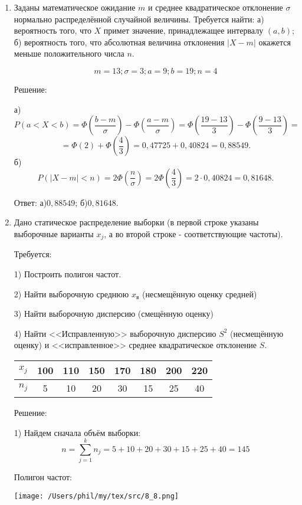 \documentclass{article}
\begin{document}
\begin{enumerate}
\item %
Заданы математическое ожидание $m$ и среднее квадратическое отклонение $\sigma$ нормально распределённой случайной величины. \newline
Требуется найти: а) вероятность того, что $X$ примет значение, принадлежащее интервалу $(a, b)$; \newline
б) вероятность того, что абсолютная величина отклонения $|X-m|$ окажется меньше положительного числа $n$.

$$m=13;\sigma=3;a=9;b=19;n=4$$
\begin{center}Решение:\end{center}
а) $$P(a<X<b)=\Phi\left(\frac{b-m}{\sigma}\right)-\Phi\left(\frac{a-m}{\sigma}\right)=\Phi\left(\frac{19-13}{3}\right)-\Phi\left(\frac{9-13}{3}\right)=$$
$$=\Phi(2)+\Phi\left(\frac{4}{3}\right)=0,47725+0,40824=0,88549.$$
б)
$$P (|X-m| < n)= 2\Phi\left(\frac{n}{\sigma}\right)=2\Phi\left(\frac{4}{3}\right)=2\cdot0,40824=0,81648.$$

Ответ: а)$0,88549$; б)$0,81648$.

\item %
Дано статическое распределение выборки (в первой строке указаны выборочные варианты $x_j$, а во второй строке - соответствующие частоты).

Требуется:

1) Построить полигон частот.

2) Найти выборочную среднюю $x_\textit{в}$ (несмещённую оценку средней)

3) Найти выборочную дисперсию (смещённую оценку)

4) Найти <<Исправленную>> выборочную дисперсию $S^2$ (несмещённую оценку) и <<исправленное>> среднее квадратическое отклонение $S$.

\begin{center}
\begin{tabular}{|c|c|c|c|c|c|c|c|}
\hline
$x_j$ & 100 & 110 & 150 & 170 & 180 & 200 & 220 \\
\hline
$n_j$ & 5 & 10 & 20 & 30 & 15 & 25 & 40 \\
\hline
\end{tabular}
\end{center}
\begin{center}Решение:\end{center}
1) Найдем сначала объём выборки: $$n=\sum_{j=1}^k n_j=5+10+20+30+15+25+40=145$$

Полигон частот:

\texttt{[image: /Users/phil/my/tex/src/8\_8.png]}


\end{enumerate}
\end{document}
